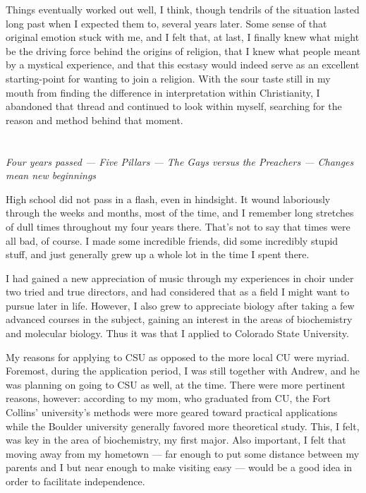 \documentclass{book}
\begin{document}
Things eventually worked out well, I think, though tendrils of the situation lasted long past when I expected them to, several years later.  Some sense of that original emotion stuck with me, and I felt that, at last, I finally knew what might be the driving force behind the origins of religion, that I knew what people meant by a mystical experience, and that this ecstasy would indeed serve as an excellent starting-point for wanting to join a religion.  With the sour taste still in my mouth from finding the difference in interpretation within Christianity, I abandoned that thread and continued to look within myself, searching for the reason and method behind that moment.

\chapter{}
\begin{center}
	\emph{Four years passed --- Five Pillars --- The Gays versus the Preachers --- Changes mean new beginnings}
\end{center}

High school did not pass in a flash, even in hindsight.  It wound laboriously through the weeks and months, most of the time, and I remember long stretches of dull times throughout my four years there.  That's not to say that times were all bad, of course.  I made some incredible friends, did some incredibly stupid stuff, and just generally grew up a whole lot in the time I spent there.

I had gained a new appreciation of music through my experiences in choir under two tried and true directors, and had considered that as a field I might want to pursue later in life.  However, I also grew to appreciate biology after taking a few advanced courses in the subject, gaining an interest in the areas of biochemistry and molecular biology.  Thus it was that I applied to Colorado State University.

My reasons for applying to CSU as opposed to the more local CU were myriad.  Foremost, during the application period, I was still together with Andrew, and he was planning on going to CSU as well, at the time.  There were more pertinent reasons, however: according to my mom, who graduated from CU, the Fort Collins' university's methods were more geared toward practical applications while the Boulder university generally favored more theoretical study.  This, I felt, was key in the area of biochemistry, my first major.  Also important, I felt that moving away from my hometown --- far enough to put some distance between my parents and I but near enough to make visiting easy --- would be a good idea in order to facilitate independence.
\end{document}
